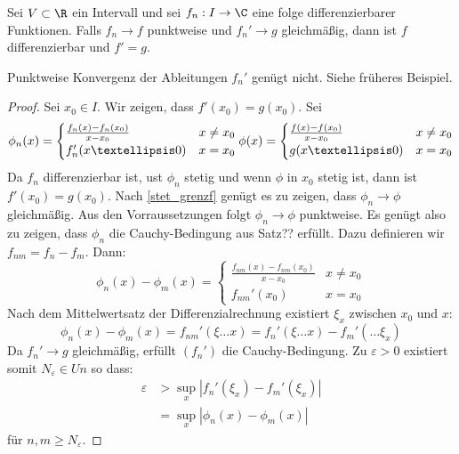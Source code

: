 \documentclass[a4paper,10pt]{scrbook}
\begin{document}
\begin{thm} \label{12.3}
Sei $V\subset\R$ ein Intervall und sei $f_n:I\to\C$ eine folge differenzierbarer Funktionen.
Falls $f_n\to f$ punktweise und $f_n'\to g$ gleichmäßig, dann ist $f$ differenzierbar und $f'=g$.
\begin{note}
Punktweise Konvergenz der Ableitungen $f_n'$ genügt nicht. Siehe früheres Beispiel.
\end{note}

\begin{proof}
Sei $x_0\in I$. Wir zeigen, dass $f'(x_0)=g(x_0)$.
Sei
\[
\phi_n(x)=\begin{cases}
\frac{f_n(x)-f_n(x_0)}{x-x_0}&x\neq x_0\\
f_n'(x…0)&x=x_0
\end{cases}\\
\phi(x)=\begin{cases}
\frac{f(x)-f(x_0)}{x-x_0}&x\neq x_0\\
g(x…0)&x=x_0
\end{cases}
\]
Da $f_n$ differenzierbar ist, ust $\phi_n$ stetig und wenn $\phi$ in $x_0$ stetig ist, dann ist $f'(x_0)=g(x_0)$.
Nach \ref{stet_grenzf} genügt es zu zeigen, dass $\phi_n\to\phi$ gleichmäßig.
Aus den Vorraussetzungen folgt $\phi_n\to\phi$ punktweise.
Es genügt also zu zeigen, dass $\phi_n$ die Cauchy-Bedingung aus Satz?? erfüllt.
Dazu definieren wir $f_{nm}=f_n-f_m$.
Dann:
\[
\phi_n(x)-\phi_m(x)=\begin{cases}
\frac{f_{nm}(x)-f_{nm}(x_0)}{x-x_0}& x\neq x_0\\
f_{nm}'(x_0) & x=x_0
\end{cases}
\]
Nach dem Mittelwertsatz der Differenzialrechnung existiert $\xi_x$ zwischen $x_0$ und $x$:
\[
\phi_n(x)-\phi_m(x)= f_{nm}'(\xi…x)=f_n'(\xi…x)-f_m'(…\xi_x)
\]
Da $f_n'\to g$ gleichmäßig, erfüllt $(f_n')$ die Cauchy-Bedingung. 
Zu $\varepsilon>0$ existiert somit $N_\varepsilon\in Un$ so dass:
\begin{align*}
\varepsilon&>\sup_x|f_n'(\xi_x)-f_m'(\xi_x)|\\
&=\sup_x|\phi_n(x)-\phi_m(x)|
\end{align*}
für $n,m\ge N_\varepsilon$.
\end{proof}
\end{thm}
\end{document}

